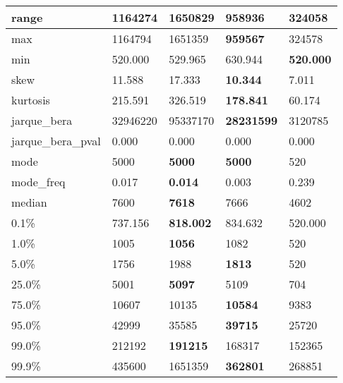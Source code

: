 \begin{table}[H]
\begin{tabular}{|l|m{10em}|m{10em}|m{10em}|m{10em}|}
\hline range & 1164274 & 1650829 & \bfseries 958936 & \cellcolor[rgb]{0.9, 0.54, 0.52} 324058 \\
\hline max & 1164794 & 1651359 & \bfseries 959567 & \cellcolor[rgb]{0.9, 0.54, 0.52} 324578 \\
\hline min & 520.000 & 529.965 & \cellcolor[rgb]{0.9, 0.54, 0.52} 630.944 & \bfseries 520.000 \\
\hline skew & 11.588 & \cellcolor[rgb]{0.9, 0.54, 0.52} 17.333 & \bfseries 10.344 & 7.011 \\
\hline kurtosis & 215.591 & 326.519 & \bfseries 178.841 & \cellcolor[rgb]{0.9, 0.54, 0.52} 60.174 \\
\hline jarque\_bera & 32946220 & \cellcolor[rgb]{0.9, 0.54, 0.52} 95337170 & \bfseries 28231599 & 3120785 \\
\hline jarque\_bera\_pval & 0.000 & 0.000 & 0.000 & 0.000 \\
\hline mode & 5000 & \bfseries 5000 & \bfseries 5000 & \cellcolor[rgb]{0.9, 0.54, 0.52} 520 \\
\hline mode\_freq & 0.017 & \bfseries 0.014 & 0.003 & \cellcolor[rgb]{0.9, 0.54, 0.52} 0.239 \\
\hline median & 7600 & \bfseries 7618 & 7666 & \cellcolor[rgb]{0.9, 0.54, 0.52} 4602 \\
\hline 0.1\% & 737.156 & \bfseries 818.002 & 834.632 & \cellcolor[rgb]{0.9, 0.54, 0.52} 520.000 \\
\hline 1.0\% & 1005 & \bfseries 1056 & 1082 & \cellcolor[rgb]{0.9, 0.54, 0.52} 520 \\
\hline 5.0\% & 1756 & 1988 & \bfseries 1813 & \cellcolor[rgb]{0.9, 0.54, 0.52} 520 \\
\hline 25.0\% & 5001 & \bfseries 5097 & 5109 & \cellcolor[rgb]{0.9, 0.54, 0.52} 704 \\
\hline 75.0\% & 10607 & 10135 & \bfseries 10584 & \cellcolor[rgb]{0.9, 0.54, 0.52} 9383 \\
\hline 95.0\% & 42999 & 35585 & \bfseries 39715 & \cellcolor[rgb]{0.9, 0.54, 0.52} 25720 \\
\hline 99.0\% & 212192 & \bfseries 191215 & 168317 & \cellcolor[rgb]{0.9, 0.54, 0.52} 152365 \\
\hline 99.9\% & 435600 & \cellcolor[rgb]{0.9, 0.54, 0.52} 1651359 & \bfseries 362801 & 268851 \\
\hline
\end{tabular}
\end{table}
